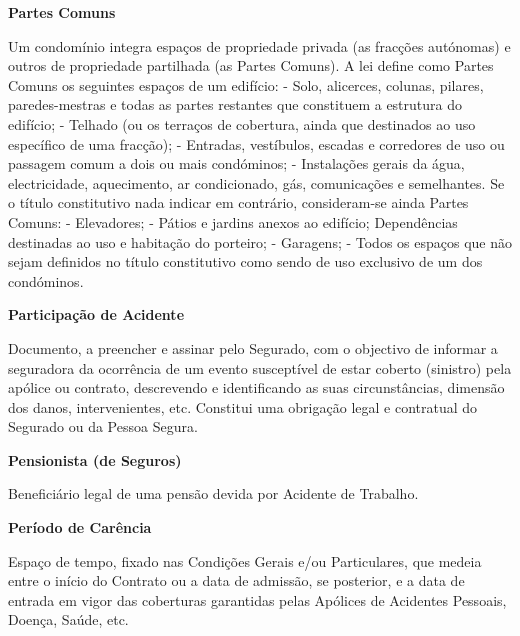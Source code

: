 \begin{description}
\item \textbf{Partes Comuns}

Um condomínio integra espaços de propriedade privada (as fracções autónomas) e outros de propriedade partilhada (as Partes Comuns). A lei define como Partes Comuns os seguintes espaços de um edifício: - Solo, alicerces, colunas, pilares, paredes-mestras e todas as partes restantes que constituem a estrutura do edifício; - Telhado (ou os terraços de cobertura, ainda que destinados ao uso específico de uma fracção); - Entradas, vestíbulos, escadas e corredores de uso ou passagem comum a dois ou mais condóminos; - Instalações gerais da água, electricidade, aquecimento, ar condicionado, gás, comunicações e semelhantes. Se o título constitutivo nada indicar em contrário, consideram-se ainda Partes Comuns: - Elevadores; - Pátios e jardins anexos ao edifício;  Dependências destinadas ao uso e habitação do porteiro; - Garagens; - Todos os espaços que não sejam definidos no título constitutivo como sendo de uso exclusivo de um dos condóminos.
\end{description}

\begin{description}
\item \textbf{Participação de Acidente}

Documento, a preencher e assinar pelo Segurado, com o objectivo de informar a seguradora da ocorrência de um evento susceptível de estar coberto (sinistro) pela apólice ou contrato, descrevendo e identificando as suas circunstâncias, dimensão dos danos, intervenientes, etc. Constitui uma obrigação legal e contratual do Segurado ou da Pessoa Segura.
\end{description}

\begin{description}
\item \textbf{Pensionista (de Seguros)}

Beneficiário legal de uma pensão devida por Acidente de Trabalho.
\end{description}

\begin{description}
\item \textbf{Período de Carência}

Espaço de tempo, fixado nas Condições Gerais e/ou Particulares, que medeia entre o início do Contrato ou a data de admissão, se posterior, e a data de entrada em vigor das coberturas garantidas pelas Apólices de Acidentes Pessoais, Doença, Saúde, etc.
\end{description}

